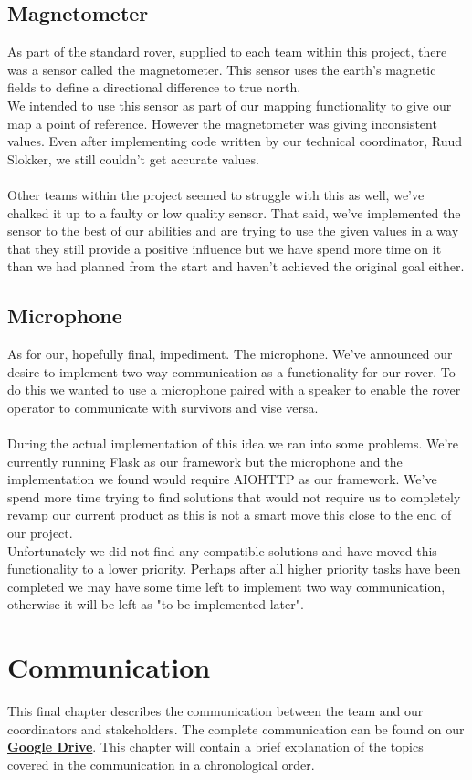 \documentclass[12pt]{article}
\begin{document}
	\subsection{Magnetometer}
	As part of the standard rover, supplied to each team within this project, there was a sensor called the magnetometer. This sensor uses the earth's magnetic fields to define a directional difference to true north.\\
	We intended to use this sensor as part of our mapping functionality to give our map a point of reference. However the magnetometer was giving inconsistent values. Even after implementing code written by our technical coordinator, Ruud Slokker, we still couldn't get accurate values.\\
	\\Other teams within the project seemed to struggle with this as well, we've chalked it up to a faulty or low quality sensor. That said, we've implemented the sensor to the best of our abilities and are trying to use the given values in a way that they still provide a positive influence but we have spend more time on it than we had planned from the start and haven't achieved the original goal either.
	\subsection{Microphone}
	As for our, hopefully final, impediment. The microphone. We've announced our desire to implement two way communication as a functionality for our rover. To do this we wanted to use a microphone paired with a speaker to enable the rover operator to communicate with survivors and vise versa.\\
	\\During the actual implementation of this idea we ran into some problems. We're currently running Flask as our framework but the microphone and the implementation we found would require AIOHTTP as our framework. We've spend more time trying to find solutions that would not require us to completely revamp our current product as this is not a smart move this close to the end of our project.\\
	Unfortunately we did not find any compatible solutions and have moved this functionality to a lower priority. Perhaps after all higher priority tasks have been completed we may have some time left to implement two way communication, otherwise it will be left as "to be implemented later". 
	\newpage
	\section{Communication}
	This final chapter describes the communication between the team and our coordinators and stakeholders. The complete communication can be found on our \href{https://drive.google.com/drive/folders/1IJEu7igVdK12MzVx3jkXZMvB5HUXFuYZ?usp=sharing}{\textbf{Google Drive}}. This chapter will contain a brief explanation of the topics covered in the communication in a chronological order.
\end{document}
